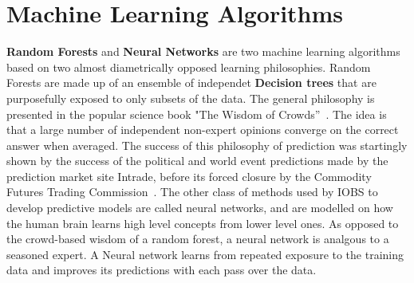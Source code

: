 \documentclass[a4paper,11pt]{article}
\begin{document}
\section{Machine Learning Algorithms}
\label{sec:algorithms}

\textbf{Random Forests} and \textbf{Neural Networks}
are two machine learning algorithms based on two almost diametrically opposed learning philosophies.
Random Forests are made up of an ensemble of independet \textbf{Decision trees} that are purposefully exposed to only subsets of the data. The general philosophy is presented in the popular science book "The Wisdom of Crowds''~\cite{wisdom}.
The idea is that a large number of independent non-expert opinions converge on the correct answer when averaged. The success of this philosophy of prediction was startingly shown by the success of the political and world event predictions made by the prediction market site Intrade, before its forced closure by the Commodity Futures Trading Commission~\cite{cassidy}. %
 The other class of methods used by IOBS to develop predictive models are called neural networks, and are modelled on how the human brain learns high level concepts from lower level ones. 
As opposed to the crowd-based wisdom of a random forest, a neural network is analgous to a seasoned expert. 
A Neural network learns from repeated exposure to the training data and improves its predictions with each pass over the data.
\end{document}
